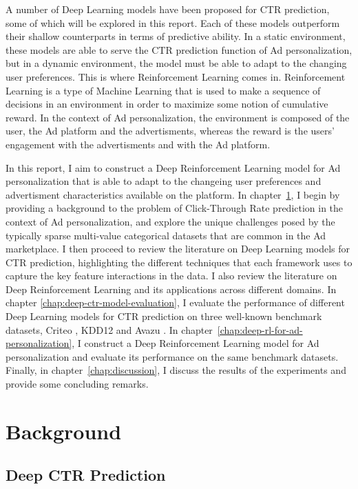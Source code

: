 \documentclass{mldsmsc}
\begin{document}
A number of Deep Learning models have been proposed for CTR prediction, some of which will be explored in this report. Each of these models
outperform their shallow counterparts in terms of predictive ability. In a static environment, these models are able to serve the CTR prediction
function of Ad personalization, but in a dynamic environment, the model must be able to adapt to the changing user preferences. This is where
Reinforcement Learning comes in. Reinforcement Learning is a type of Machine Learning that is used to make a sequence of decisions in an environment
in order to maximize some notion of cumulative reward. In the context of Ad personalization, the environment is composed of the user, the Ad platform
and the advertisments, whereas the reward is the users' engagement with the advertisments and with the Ad platform.

In this report, I aim to construct a Deep Reinforcement Learning model for Ad personalization that is able to adapt to the changeing user preferences
and advertisment characteristics available on the platform. In chapter~\ref{chap:background}, I begin by providing a background to the problem
of Click-Through Rate prediction in the context of Ad personalization, and explore the unique challenges posed by the typically sparse multi-value
categorical datasets that are common in the Ad marketplace. I then proceed to review the literature on Deep Learning models for CTR prediction, highlighting
the different techniques that each framework uses to capture the key feature interactions in the data. I also review the literature on Deep Reinforcement
Learning and its applications across different domains. In chapter \ref{chap:deep-ctr-model-evaluation}, I evaluate the performance of different
Deep Learning models for CTR prediction on three well-known benchmark datasets, Criteo \citep{RefWorks:tien2014display}, KDD12 \citep{RefWorks:aden2012kdd} 
and Avazu \citep{RefWorks:wang2014click-through}. In chapter~\ref{chap:deep-rl-for-ad-personalization}, I construct a Deep Reinforcement Learning model for Ad personalization and evaluate its performance
on the same benchmark datasets. Finally, in chapter~\ref{chap:discussion}, I discuss the results of the experiments and provide some concluding remarks.

\chapter{Background}
\label{chap:background}

\section{Deep CTR Prediction}
\end{document}
